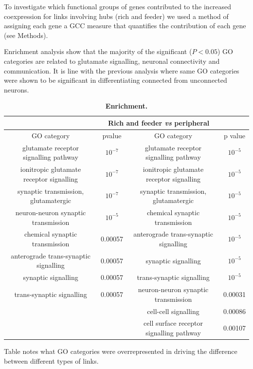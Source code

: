 \documentclass[10pt,letterpaper]{article}
\newlength\savedwidth
\newcommand\thickhline{\noalign{\global\savedwidth\arrayrulewidth\global\arrayrulewidth 2pt}%
\hline
\noalign{\global\arrayrulewidth\savedwidth}}
\begin{document}
To investigate which functional groups of genes contributed to the increased coexpression for links involving hubs (rich and feeder) we used a method of assigning each gene a GCC measure that quantifies the contribution of each gene (see Methods).

Enrichment analysis show that the majority of the significant ($P < 0.05$) GO categories are related to glutamate signalling, neuronal connectivity and communication.
It is line with the previous analysis where same GO categories were shown to be significant in differentiating connected from unconnected neurons. 
\begin{table}[!ht]
\begin{adjustwidth}{-2.25in}{0in} %
\centering
\caption{
{\bf Enrichment.}}
\begin{tabular}{ |c|c|c|c| }
\thickhline
\multicolumn{2}{c}{Connected \textit{vs} unconnected} & \multicolumn{2}{c}{Rich and feeder \textit{vs} peripheral} \\ \hline
GO category  & pvalue & GO category  	& p value \\ \thickhline
glutamate receptor signalling pathway 	& $10^{-7}$ 	& glutamate receptor signalling pathway 			& $10^{-5}$\\ \hline
ionitropic glutamate receptor signalling	& $10^{-7}$ 	& ionitropic glutamate receptor signalling		& $10^{-5}$ \\ \hline
synaptic transmission, glutamatergic 	& $10^{-7}$	& synaptic transmission, glutamatergic 			& $10^{-5}$ \\ \hline
neuron-neuron synaptic transmission 		& $10^{-5}$	& chemical synaptic transmission	 	 			& $10^{-5}$\\ \hline
chemical synaptic transmission		 	& 0.00057 	& anterograde trans-synaptic signalling			& $10^{-5}$\\ \hline
anterograde trans-synaptic signalling 	& 0.00057 	& synaptic signalling 							& $10^{-5}$\\ \hline
synaptic signalling 						& 0.00057 	& trans-synaptic signalling	 					& $10^{-5}$\\ \hline
trans-synaptic signalling				& 0.00057 	& neuron-neuron synaptic transmission  			& 0.00031 \\ \hline
										&  			& cell-cell signalling				  			& 0.00086 \\ \hline
										&  			& cell surface receptor signalling pathway 		& 0.00107 \\ \hline
\end{tabular}
\begin{flushleft} Table notes what GO categories were overrepresented in driving the difference between different types of links.
\end{flushleft}
\label{table1}
\end{adjustwidth}
\end{table}
\end{document}
